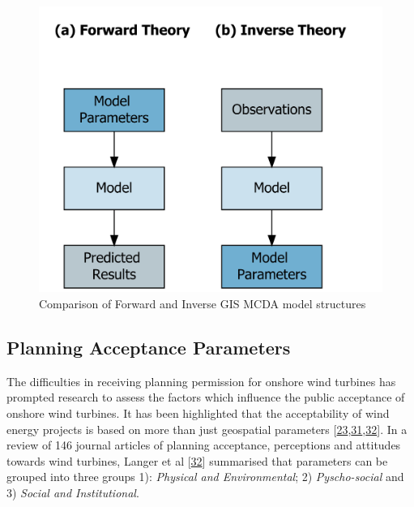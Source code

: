 \documentclass[a4paper,]{article}
\theoremstyle{definition}
\theoremstyle{definition}
\theoremstyle{definition}
\theoremstyle{remark}
\begin{document}
\begin{figure}[h]

{\centering \includegraphics[width=0.5\linewidth]{figures/InverseGIS/InverseGIS} 

}

\caption{Comparison of Forward and Inverse GIS MCDA model structures}\label{fig:InverseGIS}
\end{figure}

\subsection{Planning Acceptance
Parameters}\label{planning-acceptance-parameters}

The difficulties in receiving planning permission for onshore wind
turbines has prompted research to assess the factors which influence the
public acceptance of onshore wind turbines. It has been highlighted that
the acceptability of wind energy projects is based on more than just
geospatial parameters
{[}\protect\hyperlink{ref-VanderHorst2010}{23},\protect\hyperlink{ref-Toke2008}{31},\protect\hyperlink{ref-Langer2016}{32}{]}.
In a review of 146 journal articles of planning acceptance, perceptions
and attitudes towards wind turbines, Langer et al
{[}\protect\hyperlink{ref-Langer2016}{32}{]} summarised that parameters
can be grouped into three groups 1): \emph{Physical and Environmental};
2) \emph{Pyscho-social} and 3) \emph{Social and Institutional}.
\end{document}

